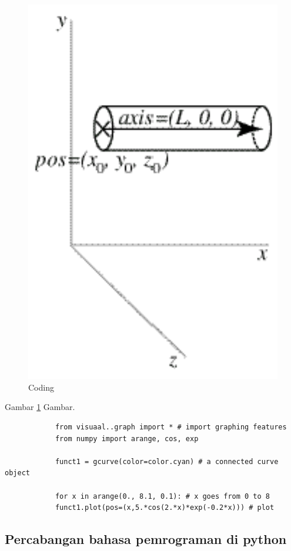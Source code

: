 		\begin{figure}[ht]
					\centerline{\includegraphics[width=1\textwidth]{figures/OSS.jpg}}
				\caption{Coding}
			\label{Vphython}
		\end{figure}
	Gambar \ref{Vphython} Gambar.
		\begin{verbatim}
			from visuaal..graph import * # import graphing features
			from numpy import arange, cos, exp

			funct1 = gcurve(color=color.cyan) # a connected curve object

			for x in arange(0., 8.1, 0.1): # x goes from 0 to 8
			funct1.plot(pos=(x,5.*cos(2.*x)*exp(-0.2*x))) # plot
		\end{verbatim}
		\subsection{Percabangan bahasa pemrograman di python}
		 
